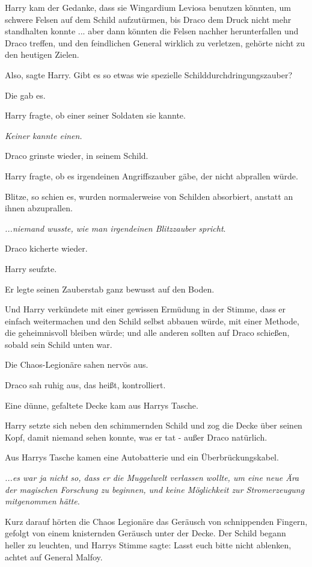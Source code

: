 Harry kam der Gedanke, dass sie Wingardium Leviosa benutzen könnten, um schwere
Felsen auf dem Schild aufzutürmen, bis Draco dem Druck nicht mehr standhalten
konnte ... aber dann könnten die Felsen nachher herunterfallen und Draco
treffen, und den feindlichen General wirklich zu verletzen, gehörte nicht zu den
heutigen Zielen.

\glqq{}Also\grqq{}, sagte Harry. \glqq{}Gibt es so etwas wie spezielle
Schilddurchdringungszauber?\grqq{}

Die gab es.

Harry fragte, ob einer seiner Soldaten sie kannte.

\emph{Keiner kannte einen.}

Draco grinste wieder, in seinem Schild.

Harry fragte, ob es irgendeinen Angriffszauber gäbe, der nicht abprallen würde.

Blitze, so schien es, wurden normalerweise von Schilden absorbiert, anstatt an
ihnen abzuprallen.

\emph{...niemand wusste, wie man irgendeinen Blitzzauber spricht}.

Draco kicherte wieder.

Harry seufzte.

Er legte seinen Zauberstab ganz bewusst auf den Boden.

Und Harry verkündete mit einer gewissen Ermüdung in der Stimme, dass er einfach
weitermachen und den Schild selbst abbauen würde, mit einer Methode, die
geheimnisvoll bleiben würde; und alle anderen sollten auf Draco schießen, sobald
sein Schild unten war.

Die Chaos-Legionäre sahen nervös aus.

Draco sah ruhig aus, das heißt, kontrolliert.

Eine dünne, gefaltete Decke kam aus Harrys Tasche.

Harry setzte sich neben den schimmernden Schild und zog die Decke über seinen
Kopf, damit niemand sehen konnte, was er tat - außer Draco natürlich.

Aus Harrys Tasche kamen eine Autobatterie und ein Überbrückungskabel.

\emph{...es war ja nicht so, dass er die Muggelwelt verlassen wollte, um eine
neue Ära der magischen Forschung zu beginnen, und keine Möglichkeit zur
Stromerzeugung mitgenommen hätte.}

Kurz darauf hörten die Chaos Legionäre das Geräusch von schnippenden Fingern,
gefolgt von einem knisternden Geräusch unter der Decke. Der Schild begann heller
zu leuchten, und Harrys Stimme sagte: \glqq{}Lasst euch bitte nicht ablenken,
achtet auf General Malfoy.\grqq{}

